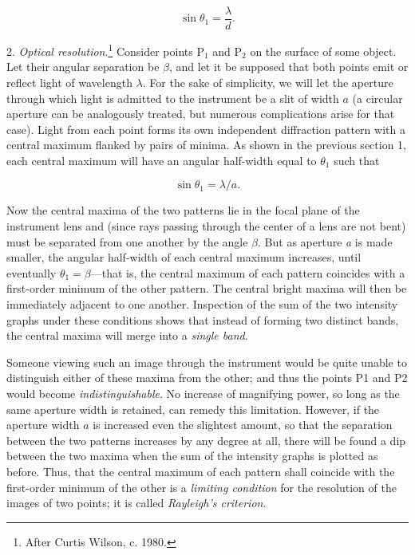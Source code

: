 \documentclass{article}
\begin{document}
\begin{equation*}
\sin \theta_1 = \frac{\lambda}{d}.
\end{equation*}

2. \emph{Optical resolution}.\footnote{After Curtis Wilson, c. 1980.}
Consider points P$_1$ and P$_2$ on the surface of some object. Let their
angular separation be $\beta$, and let it be supposed that both points
emit or reflect light of wavelength $\lambda$. For the sake of
simplicity, we will let the aperture through which light is admitted to
the instrument be a slit of width $a$ (a circular aperture can be
analogously treated, but numerous complications arise for that case).
Light from each point forms its own independent diffraction pattern with
a central maximum flanked by pairs of minima. As shown in the previous
section 1, each central maximum will have an angular half-width equal to
$\theta_1$ such that

\begin{equation*}
\sin \theta_1 = \lambda/a.
\end{equation*}

Now the central maxima of the two patterns lie in the focal plane of the
instrument lens and (since rays passing through the center of a lens are
not bent) must be separated from one another by the angle $\beta$. But
as aperture \emph{a} is made smaller, the angular half-width of each
central maximum increases, until eventually $\theta_1 = \beta$---that
is, the central maximum of each pattern coincides with a first-order
minimum of the other pattern. The central bright maxima will then be
immediately adjacent to one another. Inspection of the sum of the two
intensity graphs under these conditions shows that instead of forming
two distinct bands, the central maxima will merge into a \emph{single
band}.

Someone viewing such an image through the instrument would be quite
unable to distinguish either of these maxima from the other; and thus
the points P1 and P2 would become \emph{indistinguishable}. No increase
of magnifying power, so long as the same aperture width is retained, can
remedy this limitation. However, if the aperture width $a$ is
increased even the slightest amount, so that the separation between the
two patterns increases by any degree at all, there will be found a dip
between the two maxima when the sum of the intensity graphs is plotted
as before. Thus, that the central maximum of each pattern shall coincide
with the first-order minimum of the other is a \emph{limiting condition}
for the resolution of the images of two points; it is called
\emph{Rayleigh's criterion}.
\end{document}
